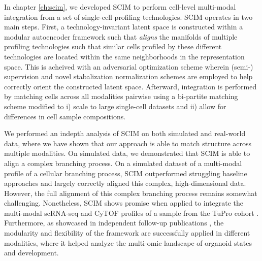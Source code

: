 In chapter \ref{ch:scim}, we developed \textsc{SCIM} to perform cell-level multi-modal integration from a set of single-cell profiling technologies.
\textsc{SCIM} operates in two main steps.
First, a technology-invariant latent space is constructed within a modular autoencoder framework such that \emph{aligns} the manifolds of multiple profiling technologies such that similar cells profiled by these different technologies are located within the same neighborhoods in the representation space.
This is acheived with an adversarial optimization scheme wherein (semi-) supervision and novel stabalization normalization schemes are employed to help correctly orient the constructed latent space.
Afterward, integration is performed by matching cells across all modalities pairwise using a bi-partite matching scheme modified to i) scale to large single-cell datasets and ii) allow for differences in cell sample compositions.

We performed an indepth analysis of \textsc{SCIM} on both simulated and real-world data, where we have shown that our approach is able to match structure across multiple modalities.
On simulated data, we demonstrated that \textsc{SCIM} is able to align a complex branching process.
On a simulated dataset of a multi-modal profile of a cellular branching process, \textsc{SCIM} outperformed struggling baseline approaches and largely correctly aligned this complex, high-dimensional data.
However, the full alignment of this complex branching process remains somewhat challenging.
Nonetheless, \textsc{SCIM} shows promise when applied to integrate the multi-modal scRNA-seq and CyTOF profiles of a sample from the TuPro cohort \citep{irmisch2020}.
Furthermore, as showcased in independent follow-up publications \citep{wahle2023,fleck2023,meier2023}, the modularity and flexibility of the framework are successfully applied in different modalities, where it helped analyze the multi-omic landscape of organoid states and development.

